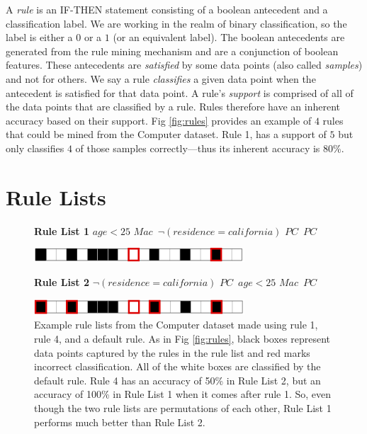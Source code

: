 A \textit{rule} is an IF-THEN statement consisting of a boolean antecedent and a classification label.
We are working in the realm of binary classification, so the label is either a $0$ or a $1$ (or an equivalent label).
The boolean antecedents are generated from the rule mining mechanism \cite{LethamRuMcMa15} and are a conjunction of boolean features.
These antecedents are \textit{satisfied} by some data points (also called \textit{samples}) and not for others.
We say a rule \textit{classifies} a given data point when the antecedent is satisfied for that data point.
A rule's \textit{support} is comprised of all of the data points that are classified by a rule.
Rules therefore have an inherent accuracy based on their support.
Fig \ref{fig:rules} provides an example of $4$ rules that could be mined from the Computer dataset.
Rule 1, has a support of $5$ but only classifies $4$ of those samples correctly---thus its inherent accuracy is $80$\%.

\section{Rule Lists}

\begin{figure}[t!]
\begin{algorithmic}
\normalsize

\State \textbf{Rule List 1}
\State \bif $age < 25$ \bthen $Mac$\,
\State \belif $\neg (residence=california)$ \bthen $PC$\,
\State \belse $PC$

\begin{raggedleft}
\includegraphics[width=0.7\textwidth]{figs/rule_list_1_cap.png}\\
\end{raggedleft}
\State \textbf{Rule List 2}
\State \bif $\neg (residence=california)$ \bthen $PC$\,
\State \belif $age < 25$ \bthen $Mac$\,
\State \belse $PC$

\begin{raggedleft}
\includegraphics[width=0.7\textwidth]{figs/rule_list_2_cap.png}
\end{raggedleft}

\end{algorithmic}
\caption{Example rule lists from the Computer dataset made using rule 1, rule 4, and a default rule.
As in Fig \ref{fig:rules}, black boxes represent data points captured by the rules in the rule list and red marks incorrect classification.
All of the white boxes are classified by the default rule.
Rule 4 has an accuracy of 50\% in Rule List 2, but an accuracy of 100\% in Rule List 1 when it comes after rule 1.
So, even though the two rule lists are permutations of each other, Rule List 1 performs much better than Rule List 2.}
\label{fig:rule-list-computer}
\end{figure}

